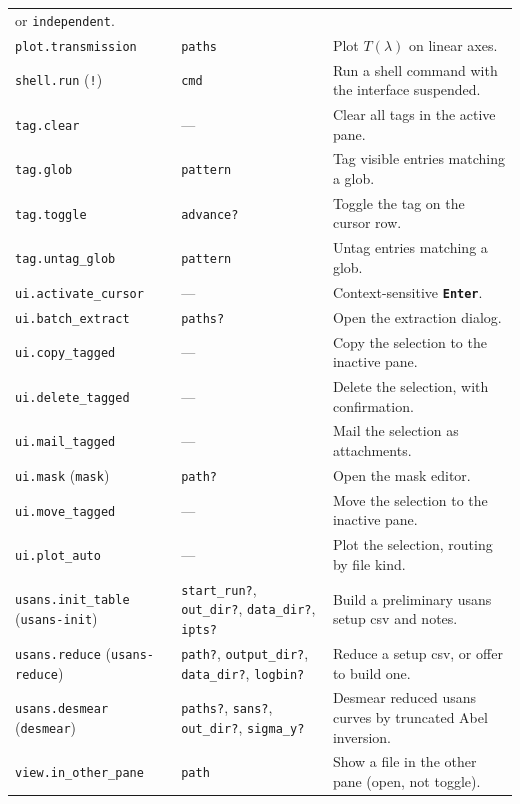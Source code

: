 \documentclass[tm]{ornltm}
\newcommand{\key}[1]{\textbf{\texttt{#1}}}
\begin{document}
\begin{small}
\begin{longtable}{p{} p{} p{}}
    or \texttt{independent}. \\
  \texttt{plot.transmission} & \texttt{paths} & Plot $T(\lambda)$ on linear
    axes. \\
  \texttt{shell.run} (\texttt{!}) & \texttt{cmd} & Run a shell command with the
    interface suspended. \\
  \texttt{tag.clear} & --- & Clear all tags in the active pane. \\
  \texttt{tag.glob} & \texttt{pattern} & Tag visible entries matching a
    glob. \\
  \texttt{tag.toggle} & \texttt{advance?} & Toggle the tag on the cursor
    row. \\
  \texttt{tag.untag\_glob} & \texttt{pattern} & Untag entries matching a
    glob. \\
  \texttt{ui.activate\_cursor} & --- & Context-sensitive \key{Enter}. \\
  \texttt{ui.batch\_extract} & \texttt{paths?} & Open the extraction dialog. \\
  \texttt{ui.copy\_tagged} & --- & Copy the selection to the inactive pane. \\
  \texttt{ui.delete\_tagged} & --- & Delete the selection, with
    confirmation. \\
  \texttt{ui.mail\_tagged} & --- & Mail the selection as attachments. \\
  \texttt{ui.mask} (\texttt{mask}) & \texttt{path?} & Open the mask editor. \\
  \texttt{ui.move\_tagged} & --- & Move the selection to the inactive pane. \\
  \texttt{ui.plot\_auto} & --- & Plot the selection, routing by file kind. \\
  \texttt{usans.init\_table} (\texttt{usans-init}) & \texttt{start\_run?},
    \texttt{out\_dir?}, \texttt{data\_dir?}, \texttt{ipts?} & Build a
    preliminary \ac{usans} setup \ac{csv} and notes. \\
  \texttt{usans.reduce} (\texttt{usans-reduce}) & \texttt{path?},
    \texttt{output\_dir?}, \texttt{data\_dir?}, \texttt{logbin?} & Reduce a
    setup \ac{csv}, or offer to build one. \\
  \texttt{usans.desmear} (\texttt{desmear}) & \texttt{paths?},
    \texttt{sans?}, \texttt{out\_dir?}, \texttt{sigma\_y?} & Desmear
    reduced \ac{usans} curves by truncated Abel inversion. \\
  \texttt{view.in\_other\_pane} & \texttt{path} & Show a file in the other pane
    (open, not toggle). \\

\end{longtable}
\end{small}
\end{document}
